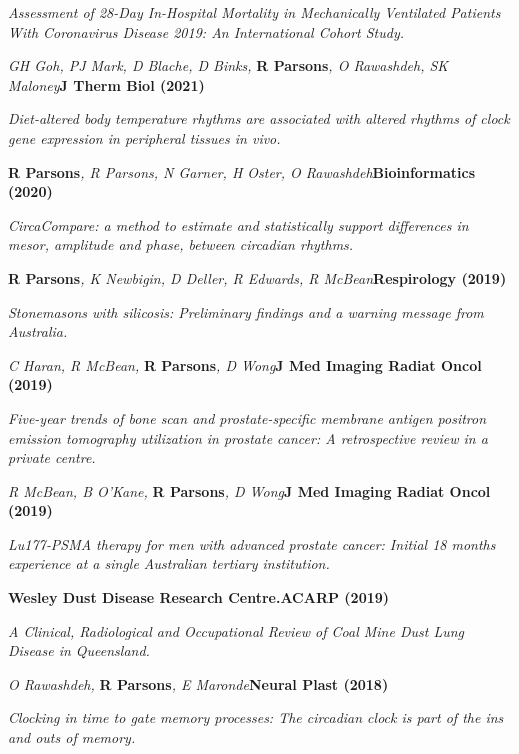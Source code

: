     \textit{Assessment of 28-Day In-Hospital Mortality in Mechanically Ventilated Patients With Coronavirus Disease 2019: An International Cohort Study.}
\item
    \textit{GH Goh, PJ Mark, D Blache, D Binks, }\textbf{R Parsons}\textit{, O Rawashdeh, SK Maloney}\textbf{\hfill J Therm Biol (2021)}\par 
    \textit{Diet-altered body temperature rhythms are associated with altered rhythms of clock gene expression in peripheral tissues in vivo.}
\item
    \textbf{R Parsons}\textit{, R Parsons, N Garner, H Oster, O Rawashdeh}\textbf{\hfill Bioinformatics (2020)}\par 
    \textit{CircaCompare: a method to estimate and statistically support differences in mesor, amplitude and phase, between circadian rhythms.}
\item
    \textbf{R Parsons}\textit{, K Newbigin, D Deller, R Edwards, R McBean}\textbf{\hfill Respirology (2019)}\par 
    \textit{Stonemasons with silicosis: Preliminary findings and a warning message from Australia.}
\item
    \textit{C Haran, R McBean, }\textbf{R Parsons}\textit{, D Wong}\textbf{\hfill J Med Imaging Radiat Oncol (2019)}\par 
    \textit{Five-year trends of bone scan and prostate-specific membrane antigen positron emission tomography utilization in prostate cancer: A retrospective review in a private centre.}
\item
    \textit{R McBean, B O'Kane, }\textbf{R Parsons}\textit{, D Wong}\textbf{\hfill J Med Imaging Radiat Oncol (2019)}\par 
    \textit{Lu177‐PSMA therapy for men with advanced prostate cancer: Initial 18 months experience at a single Australian tertiary institution.}
\item
    \textbf{Wesley Dust Disease Research Centre.}\textbf{\hfill ACARP (2019)}\par 
    \textit{A Clinical, Radiological and Occupational Review of Coal Mine Dust Lung Disease in Queensland.}
\item
    \textit{O Rawashdeh, }\textbf{R Parsons}\textit{, E Maronde}\textbf{\hfill Neural Plast (2018)}\par 
    \textit{Clocking in time to gate memory processes: The circadian clock is part of the ins and outs of memory.}
